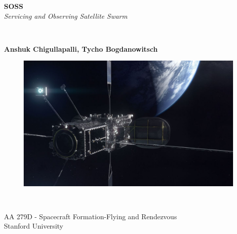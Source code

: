 \documentclass[11pt,letterpaper]{article}
\newcommand{\userName}{Anshuk Chigullapalli, Tycho Bogdanowitsch}
\begin{document}
\begin{titlepage}
    \begin{center}
        \vspace*{1cm}
        
        \Huge
        \textbf{SOSS}\\
        
        \Huge \textit{Servicing and Observing Satellite Swarm} \\ 
        \vspace{0.5cm}
        
        
        \vspace{0.5cm}
        \LARGE
        \ 
        
        \vspace{1.00cm}
        \textbf{\userName}
        \vspace{1.00cm}
        
        \vfill
        \begin{figure}[H]
		\centering 
		\includegraphics[width = 5.5in]{Figures/mev_ng.jpg}
		\label{Figure: Title Graphic}
		\end{figure}
        \        
        
        \Large
        AA 279D - Spacecraft Formation-Flying and Rendezvous\\
        Stanford University\\
        
    \end{center}
\end{titlepage}

\end{document}
